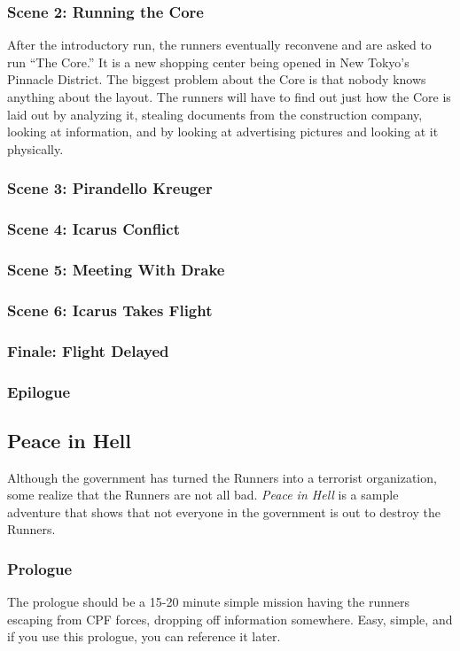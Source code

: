 \documentclass{article}
\begin{document}
\subsubsection{Scene 2: Running the Core}
After the introductory run, the runners eventually reconvene and are asked to
run “The Core.” It is a new shopping center being opened in New Tokyo’s Pinnacle District. The biggest problem about the Core is that nobody knows anything about the layout. The runners will have to find out just how the Core is laid out by analyzing it, stealing documents from the construction company, looking at information, and by looking at advertising pictures and looking at it physically.
\subsubsection{Scene 3: Pirandello Kreuger}
\subsubsection{Scene 4: Icarus Conflict}
\subsubsection{Scene 5: Meeting With Drake}
\subsubsection{Scene 6: Icarus Takes Flight}
\subsubsection{Finale: Flight Delayed}
\subsubsection{Epilogue}
\subsection{Peace in Hell}
Although the government has turned the Runners into a terrorist organization,
some realize that the Runners are not all bad. \emph{Peace in Hell} is a sample
adventure that shows that not everyone in the government is out to destroy the Runners.
\subsubsection{Prologue}
The prologue should be a 15-20 minute simple mission having the runners escaping
from CPF forces, dropping off information somewhere. Easy, simple, and if you use this prologue, you can reference it later.
\end{document}

